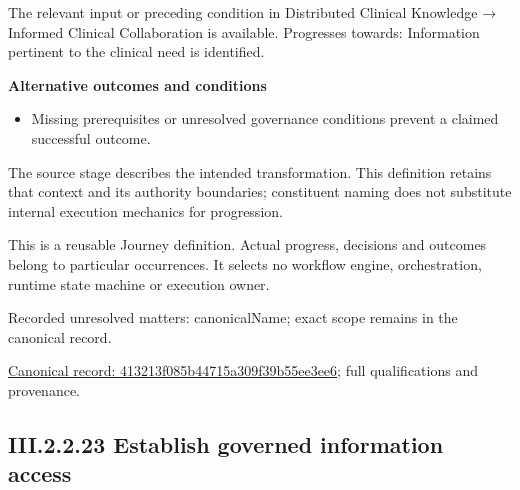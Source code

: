 The relevant input or preceding condition in Distributed Clinical Knowledge → Informed Clinical Collaboration is available. Progresses towards: Information pertinent to the clinical need is identified.



\par\medskip\textbf{Alternative outcomes and conditions}\par


\begin{itemize}


\item Missing prerequisites or unresolved governance conditions prevent a claimed successful outcome.

\end{itemize}


The source stage describes the intended transformation. This definition retains that context and its authority boundaries; constituent naming does not substitute internal execution mechanics for progression.



This is a reusable Journey definition. Actual progress, decisions and outcomes belong to particular occurrences. It selects no workflow engine, orchestration, runtime state machine or execution owner.


{\small Recorded unresolved matters: canonicalName; exact scope remains in the canonical record.}\par
{\footnotesize \href{../../../../continuum/strategy/value-stream/413213f085b44715a309f39b55ee3ee6.md}{Canonical record: 413213f085b44715a309f39b55ee3ee6}; full qualifications and provenance.}\par
\subsection*{III.2.2.23 Establish governed information access}
\label{navigation:III.2.2.23}

